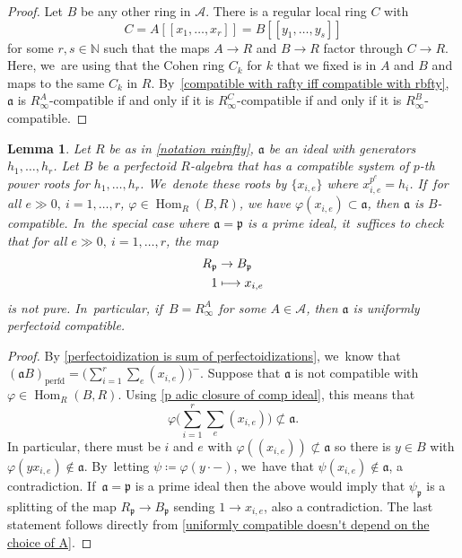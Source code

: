 \documentclass[11pt]{article}
\let\autoref\cref
\newcommand\mto{\mathchoice{\longmapsto}{\mapsto}{\mapsto}{\mapsto}}
\theoremstyle{plain}
\newtheorem{lemma}[theorem]{Lemma}
\theoremstyle{definition}
\numberwithin{equation}{theorem}
\newcommand{\N}{\mathbb {N}}
\newcommand{\fra}{\mathfrak{a}}
\newcommand{\p}{\mathfrak{p}}
\DeclareMathOperator{\Hom}{Hom}
\newcommand{\perfd}{_{\mathrm{perfd}}}
\newcommand{\llbracket}{[\![}
\newcommand{\rrbracket}{]\!]}
\newcommand{\nsubset}{\not\subset}
\newcommand{\sA}{\mathcal{A}}
\newcommand{\pe}{{p^e}}
\renewcommand{\phi}{\varphi}
\newcommand{\rafty}{R^A_\infty}
\begin{document}
\begin{proof}
Let $B$ be any other ring in $\sA$.
There is a regular local ring $C$ with
\[
C=A\llbracket x_1,\ldots,x_r\rrbracket = B\llbracket y_1,\ldots,y_s\rrbracket
\]
for some $r, s\in \N$ such that the maps $A\to R$ and $B\to R$ factor through $C\to R$. Here, we~are using that the Cohen ring $C_k$ for $k$ that we fixed is in $A$ and $B$ and maps to the same $C_k$ in $R$. By~\autoref{compatible with rafty iff compatible with rbfty}, $\fra$ is $\rafty$-compatible if and only if it is $R^C_\infty$-compatible if and only if it is $R^B_\infty$-compatible.
\end{proof}

\begin{lemma}\label{not pfd pure p not in P implies compatible}
Let $R$ be as in \autoref{notation rainfty}, $\fra$ be an ideal with generators $h_1,\ldots,h_r$. Let $B$ be a perfectoid $R$\nobreakdash-algebra that has a compatible system of $p$-th power roots for $h_1,\ldots, h_r$. We~denote these roots by $\{x_{i,e}\}$ where $x_{i,e}^\pe=h_i$. If~for all $e\gg 0, \ i=1,\ldots,r$, $\phi\in \Hom_R(B,R)$, we have $\phi(x_{i,e})\subset \fra$, then $\fra$ is $B$-compatible. In~the special case where $\fra=\p$ is a prime ideal, it~suffices to check that for all $e\gg 0, \ i=1,\ldots,r$, the map
\begin{equation}\label{map to loc of rafty at p}
\begin{aligned}
R_\p &\to B_\p\\
1 &\mto x_{i,e}
\end{aligned}
\end{equation}
is not pure. In~particular, if~$B=\rafty$ for some $A\in \sA$, then $\fra$ is uniformly perfectoid compatible.
\end{lemma}

\begin{proof}
By \autoref{perfectoidization is sum of perfectoidizations}, we~know that $(\fra B)\perfd=\bigl(\sum_{i=1}^r \sum_e (x_{i,e})\bigr)^{-}$. Suppose that $\fra$ is not compatible with $\phi\in \Hom_R(B,R)$. Using \autoref{p adic closure of comp ideal}, this means that
\[
\phi\biggl(\sum_{i=1}^r \sum_e (x_{i,e}) \biggr)\nsubset \fra.
\]
In particular, there must be $i$ and $e$ with $\phi( (x_{i,e}))\nsubset \fra$ so there is $y\in B$ with $\phi( yx_{i,e})\notin \fra$. By~letting $\psi\coloneqq \phi(y\cdot -)$, we~have that $\psi(x_{i,e})\notin \fra$, a contradiction. If~$\fra=\p$ is a prime ideal then the above would imply that $\psi_\p$ is a splitting of the map $R_\p\to B_\p$ sending $1\to x_{i,e}$, also a contradiction. The last statement follows directly from \autoref{uniformly compatible doesn't depend on the choice of A}.
\end{proof}
\end{document}
